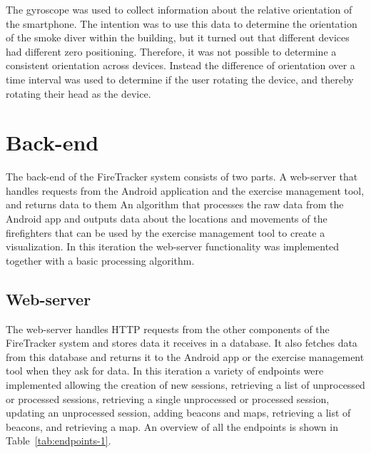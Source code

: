 \documentclass[../Main/thesis.tex]{subfiles}
\begin{document}
The gyroscope was used to collect information about the relative orientation of the smartphone. 
The intention was to use this data to determine the orientation of the smoke diver within the building, but it turned out that different devices had different zero positioning.
Therefore, it was not possible to determine a consistent orientation across devices.
Instead the difference of orientation over a time interval was used to determine if the user rotating the device, and thereby rotating their head as the device. 

\section{Back-end}
The back-end of the FireTracker system consists of two parts.
A web-server that handles requests from the Android application and the exercise management tool, and returns data to them
An algorithm that processes the raw data from the Android app and outputs data about the locations and movements of the firefighters that can be used by the exercise management tool to create a visualization.
In this iteration the web-server functionality was implemented together with a basic processing algorithm.

\subsection{Web-server}
The web-server handles HTTP requests from the other components of the FireTracker system and stores data it receives in a database. 
It also fetches data from this database and returns it to the Android app or the exercise management tool when they ask for data.
In this iteration a variety of endpoints were implemented allowing the creation of new sessions, retrieving a list of unprocessed or processed sessions, retrieving a single unprocessed or processed session, updating an unprocessed session, adding beacons and maps, retrieving a list of beacons, and retrieving a map. 
An overview of all the endpoints is shown in Table~\ref{tab:endpoints-1}.
\end{document}
